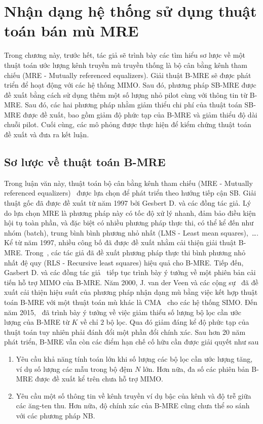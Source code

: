 \clearpage
{}

\setcounter{chapter}{1}
\chapter[{NHẬN DẠNG HỆ THỐNG SỬ DỤNG THUẬT TOÁN BÁN MÙ MRE}]{Nhận dạng hệ thống sử dụng thuật toán bán mù MRE}
\label{sec:MRE}

Trong chương này, trước hết, tác giả sẽ trình bày các tìm hiểu sơ lược về một thuật toán ước lượng kênh truyền mù truyền thống là bộ cân bằng kênh tham chiếu (MRE - Mutually referenced equalizers). Giải thuật B-MRE sẽ được phát triển để hoạt động với các hệ thống MIMO. Sau đó, phương pháp SB-MRE được đề xuất bằng cách sử dụng thêm một số lượng nhỏ pilot cùng với thông tin từ B-MRE. Sau đó, các hai phương pháp nhằm giảm thiểu chi phí của thuật toán SB-MRE được đề xuất, bao gồm giảm độ phức tạp của B-MRE và giảm thiểu độ dài chuỗi pilot. Cuối cùng, các mô phỏng được thực hiện để kiểm chứng thuật toán đề xuất và đưa ra kết luận.

\section{Sơ lược về thuật toán B-MRE}

Trong luận văn này, thuật toán bộ cân bằng kênh tham chiếu (MRE - Mutually referenced equalizers)~\cite{original} được lựa chọn để phát triển theo hướng tiếp cận SB. Giải thuật gốc đã được đề xuất từ năm 1997 bởi Gesbert D. và các đồng tác giả. Lý do lựa chọn MRE là phương pháp này có tốc độ xử lý nhanh, đảm bảo điều kiện hội tụ toàn phần, và đặc biệt có nhiều phương pháp thực thi, có thể kể đến như nhóm (batch), trung bình bình phương nhỏ nhất (LMS - Least mean squares),~\ldots. Kể từ năm 1997, nhiều công bố đã được đề xuất nhằm cải thiện giải thuật B-MRE. Trong~\cite{GesbertSPAWC}, các tác giả đã đề xuất phương pháp thực thi bình phương nhỏ nhất đệ quy (RLS - Recursive least squares) hiệu quả cho B-MRE. Tiếp đến, Gasbert D. và các đồng tác giả~\cite{Gesbert1997} tiếp tục trình bày ý tưởng về một phiên bản cải tiến hỗ trợ MIMO của B-MRE. Năm 2000, J. van der Veen và các cộng sự~\cite{Veen2000} đã đề xuất cải thiện hiệu suất của phương pháp nhận dạng mù bằng việc kết hợp thuật toán B-MRE với một thuật toán mù khác là CMA~\cite{Treichler1983} cho các hệ thống SIMO. Đến năm 2015,~\cite{Yu2015} đã trình bày ý tưởng về việc giảm thiểu số lượng bộ lọc cần ước lượng của B-MRE từ $K$ về chỉ $2$ bộ lọc. Qua đó giảm đáng kể độ phức tạp của thuật toán tuy nhiên phải đánh đổi một phần đổi chính xác. Sau hơn 20 năm phát triển, B-MRE vẫn còn các điểm hạn chế cố hữu cần được giải quyết như sau
\begin{enumerate}
    \item Yêu cầu khả năng tính toán lớn khi số lượng các bộ lọc cần ước lượng tăng, ví dụ số lượng các mẫu trong bộ đệm $N$ lớn. Hơn nữa, đa số các phiên bản B-MRE được đề xuất kể trên chưa hỗ trợ MIMO.
    \item Yêu cầu một số thông tin về kênh truyền ví dụ bậc của kênh và độ trễ giữa các ăng-ten thu. Hơn nữa, độ chính xác của B-MRE cũng chưa thể so sánh với các phương pháp NB.
\end{enumerate}

